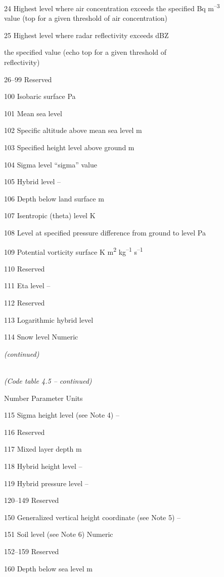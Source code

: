 24 Highest level where air concentration exceeds the specified Bq m\textsuperscript{--3}\\
value (top for a given threshold of air concentration)

25 Highest level where radar reflectivity exceeds dBZ

the specified value (echo top for a given threshold of\\
reflectivity)

26--99 Reserved

100 Isobaric surface Pa

101 Mean sea level

102 Specific altitude above mean sea level m

103 Specified height level above ground m

104 Sigma level ``sigma'' value

105 Hybrid level --

106 Depth below land surface m

107 Isentropic (theta) level K

108 Level at specified pressure difference from ground to level Pa

109 Potential vorticity surface K m\textsuperscript{2} kg\textsuperscript{--1} s\textsuperscript{--1}

110 Reserved

111 Eta level --

112 Reserved

113 Logarithmic hybrid level

114 Snow level Numeric

\emph{(continued)}

\emph{\\
(Code table 4.5 -- continued)}

Number Parameter Units

115 Sigma height level (see Note 4) --

116 Reserved

117 Mixed layer depth m

118 Hybrid height level --

119 Hybrid pressure level --

120--149 Reserved

150 Generalized vertical height coordinate (see Note 5) --

151 Soil level (see Note 6) Numeric

152--159 Reserved

160 Depth below sea level m

